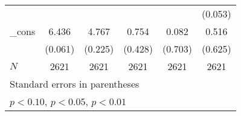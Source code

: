 {\begin{tabular}{l*{5}{c}}
            &                     &                     &                     &                     &     (0.053)         \\
\addlinespace
\_cons      &       6.436\sym{***}&       4.767\sym{***}&       0.754\sym{*}  &       0.082         &       0.516         \\
            &     (0.061)         &     (0.225)         &     (0.428)         &     (0.703)         &     (0.625)         \\
\midrule
\(N\)       &        2621         &        2621         &        2621         &        2621         &        2621         \\
\bottomrule
\multicolumn{6}{l}{\footnotesize Standard errors in parentheses}\\
\multicolumn{6}{l}{\footnotesize \sym{*} \(p<0.10\), \sym{**} \(p<0.05\), \sym{***} \(p<0.01\)}\\
\end{tabular}
}
